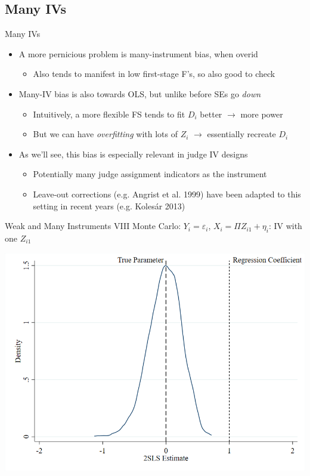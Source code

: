 \documentclass{beamer}
\begin{document}
\subsection{Many IVs}
\begin{frame}{Many IVs}
\begin{itemize}
\item A more pernicious problem is many-instrument bias, when overid\smallskip
\begin{itemize}
\item Also tends to manifest in low first-stage F's, so also good to check
\end{itemize}\bigskip\pause{}
\item Many-IV bias is also towards OLS, but unlike before SEs go \emph{down}\smallskip
\begin{itemize}
\item Intuitively, a more flexible FS tends to fit $D_i$ better $\rightarrow$ more power\smallskip
\item But we can have \emph{overfitting} with lots of $Z_i$ $\rightarrow$ essentially recreate $D_i$
\end{itemize}\bigskip\pause{}
\item As we'll see, this bias is especially relevant in judge IV designs\smallskip
\begin{itemize}
\item Potentially many judge assignment indicators as the instrument\smallskip
\item Leave-out corrections (e.g. Angrist et al. 1999) have been adapted to this setting in recent years (e.g. Koles\'{a}r 2013)
\end{itemize}
\end{itemize}
\end{frame}

\begin{frame}{Weak and Many Instruments VIII}
Monte Carlo: $Y_i=\varepsilon_i$, $X_i=\Pi Z_{i1}+\eta_i$: IV with one $Z_{i1}$
\begin{center}
\includegraphics[scale=0.35]{./lecture_includes/fewz.png}
\end{center}

\end{frame}
\end{document}
